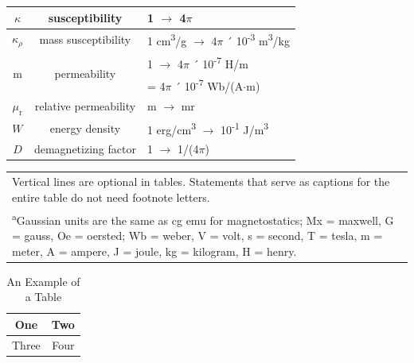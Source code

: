 \begin{table}[!bt]
\begin{tabular}{c|c|l}
 $\kappa$  & susceptibility & 1 $\rightarrow$ 4$\pi$ \\ \hline
 $\kappa_\rho$    & mass susceptibility & 1 cm\textsuperscript{3}/g $\rightarrow$ 4$\pi$ ´ 10\textsuperscript{-3} m\textsuperscript{3}/kg \\ \hline
 \multirow{2}[0]{*}{m} & \multirow{2}[0]{*}{permeability} & 1 $\rightarrow$ 4$\pi$ ´ 10\textsuperscript{-7} H/m  \\ 
       &       &   = 4$\pi$ ´ 10\textsuperscript{-7} Wb/(A$\cdot$m) \\ \hline
 $\mu_\mathrm{r}$    & relative permeability & m $\rightarrow$ mr \\ \hline
$W$ & energy density & 1 erg/cm\textsuperscript{3} $\rightarrow$ 10\textsuperscript{-1} J/m\textsuperscript{3} \\ \hline
$D$  & demagnetizing factor & 1 $\rightarrow$ 1/(4$\pi$)\\
 \hline
 \hline
 \end{tabular}%
\newline
 \begin{tabular}{p{}}
  Vertical lines are optional in tables. Statements that serve as captions for the entire table do not need footnote letters. \\
	\textsuperscript{a}Gaussian units are the same as cg emu for magnetostatics; Mx = maxwell, G = gauss, Oe = oersted; Wb = weber, V = volt, s = second, T = tesla, m = meter, A = ampere, J = joule, kg = kilogram, H = henry.
 \end{tabular}
\end{table}






\begin{table}[!bt]
	\renewcommand{\arraystretch}{1.3}
	\caption{An Example of a Table}
	\label{tab:table_example}
	\vspace{-2ex}
	\centering
	\begin{tabular}{c|c}
		\hline
		\hline
		One & Two\\
		\hline
		Three & Four\\
		\hline
		\hline
	\end{tabular}
\end{table}



